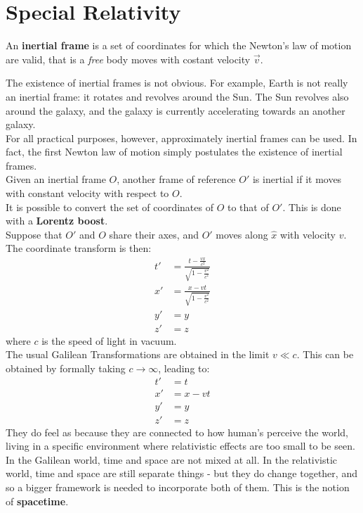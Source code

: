 \documentclass[../template.tex]{subfiles}
\begin{document}
\section{Special Relativity}

\begin{dfn}
An \textbf{inertial frame} is a set of coordinates for which the Newton's law of motion are valid, that is a \textit{free} body moves with costant velocity $\vec{v}$.
\end{dfn}

The existence of inertial frames is not obvious. For example, Earth is not really an inertial frame: it rotates and revolves around the Sun. The Sun revolves also around the galaxy, and the galaxy is currently accelerating towards an another galaxy.\\
For all practical purposes, however, approximately inertial frames can be used. In fact, the first Newton law of motion simply postulates the existence of inertial frames.\\

Given an inertial frame $O$, another frame of reference $O'$ is inertial if it moves with constant velocity with respect to $O$.\\
It is possible to convert the set of coordinates of $O$ to that of $O'$. This is done with a \textbf{Lorentz boost}.\\
Suppose that $O'$ and $O$ share their axes, and $O'$ moves along $\hat{x}$ with velocity $v$. The coordinate transform is then:
\begin{align*}
t' &= \frac{t-\frac{vx}{c^2}}{\sqrt{1-\frac{v^2}{c^2}}}\\
x' &= \frac{x-vt}{\sqrt{1-\frac{v^2}{c^2}}}\\
y' &= y\\
z' &= z
\end{align*} 
where $c$ is the speed of light in vacuum.\\

The usual Galilean Transformations are obtained in the limit $v\ll c$. This can be obtained by formally taking $c\to \infty$, leading to:
\begin{align*}
t' &= t\\
x' &= x-vt\\
y' &= y\\
z' &= z
\end{align*}
They do feel as  because they are connected to how human's perceive the world, living in a specific environment where relativistic effects are too small to be seen.\\
In the Galilean world, time and space are not mixed at all. In the relativistic world, time and space are still separate things - but they do change together, and so a bigger framework is needed to incorporate both of them. This is the notion of \textbf{spacetime}.\\
\end{document}
